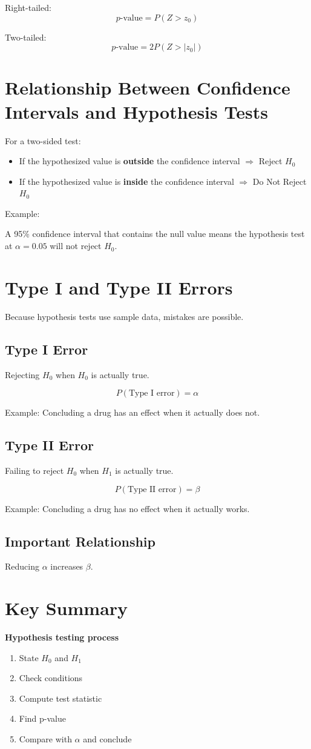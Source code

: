 \documentclass[11pt]{article}
\begin{document}
Right-tailed:
\[
p\text{-value}=P(Z>z_0)
\]

Two-tailed:
\[
p\text{-value}=2P(Z>|z_0|)
\]


\section{Relationship Between Confidence Intervals and Hypothesis Tests}

For a two-sided test:

\begin{itemize}
\item If the hypothesized value is \textbf{outside} the confidence interval $\Rightarrow$ Reject $H_0$
\item If the hypothesized value is \textbf{inside} the confidence interval $\Rightarrow$ Do Not Reject $H_0$
\end{itemize}

Example:

A 95\% confidence interval that contains the null value means the hypothesis test at $\alpha = 0.05$ will not reject $H_0$.

\section{Type I and Type II Errors}

Because hypothesis tests use sample data, mistakes are possible.

\subsection{Type I Error}

Rejecting $H_0$ when $H_0$ is actually true.

\[
P(\text{Type I error}) = \alpha
\]

Example: Concluding a drug has an effect when it actually does not.

\subsection{Type II Error}

Failing to reject $H_0$ when $H_1$ is actually true.

\[
P(\text{Type II error}) = \beta
\]

Example: Concluding a drug has no effect when it actually works.

\subsection{Important Relationship}

Reducing $\alpha$ increases $\beta$.

\section{Key Summary}

\textbf{Hypothesis testing process}

\begin{enumerate}
\item State $H_0$ and $H_1$
\item Check conditions
\item Compute test statistic
\item Find p-value
\item Compare with $\alpha$ and conclude
\end{enumerate}
\end{document}
